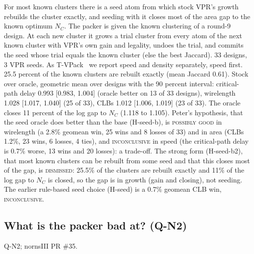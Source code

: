  For most known clusters there is a seed atom from which stock VPR's growth rebuilds the cluster exactly, and seeding with it closes most of the area gap to the known optimum $N_C$.
 The packer is given the known clustering of a round-9 design. At each new cluster it grows a trial cluster from every atom of the next known cluster with VPR's own gain and legality, undoes the trial, and commits the seed whose trial equals the known cluster (else the best Jaccard). 33 designs, 3 VPR seeds. As T-VPack~\cite{marquardt99cluster} we report speed and density separately, speed first. %
 25.5 percent of the known clusters are rebuilt exactly (mean Jaccard 0.61). Stock over oracle, geometric mean over designs with the 90 percent interval: critical-path delay 0.993 [0.983, 1.004] (oracle better on 13 of 33 designs), wirelength 1.028 [1.017, 1.040] (25 of 33), CLBs 1.012 [1.006, 1.019] (23 of 33). The oracle closes 11 percent of the log gap to $N_C$ (1.118 to 1.105).
 Peter's hypothesis, that the seed oracle does better than the base (H-seed-b), is \textsc{possibly good} in wirelength (a 2.8\% geomean win, 25 wins and 8 losses of 33) and in area (CLBs 1.2\%, 23 wins, 6 losses, 4 ties), and \textsc{inconclusive} in speed (the critical-path delay is 0.7\% worse, 13 wins and 20 losses): a trade-off. The strong form (H-seed-b2), that most known clusters can be rebuilt from some seed and that this closes most of the gap, is \textsc{dismissed}: 25.5\% of the clusters are rebuilt exactly and 11\% of the log gap to $N_C$ is closed, so the gap is in growth (gain and closing), not seeding. The earlier rule-based seed choice (H-seed) is a 0.7\% geomean CLB win, \textsc{inconclusive}.

\subsection{What is the packer bad at? (Q-N2)}
\label{sec:e-q2}

 Q-N2; nornsIII PR \#35.

